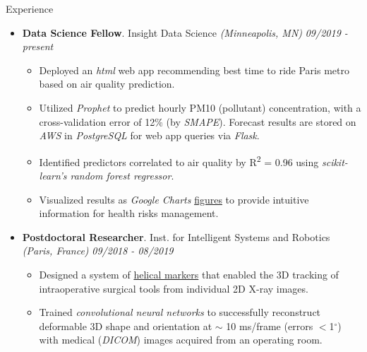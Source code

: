 \documentclass{resume} %
\begin{document}
	\begin{rSection}{Experience}
		
		\begin{itemize}[leftmargin=0em]
			\item {\bf Data Science Fellow}{. Insight Data Science \textit{(Minneapolis, MN)}} \hfill {\em 09/2019 - present}\\
			\vspace{-5mm}
			\begin{itemize}
				\setlength\itemsep{-1.75em}
				\item Deployed an \textit{html} web app recommending best time to ride Paris metro based on air quality prediction.\\
				\item Utilized \textit{Prophet} to predict hourly PM10 (pollutant) concentration, with a cross-validation error of 12\% (by \textit{SMAPE}). Forecast results are stored on \textit{AWS} in \textit{PostgreSQL} for web app queries via \textit{Flask}.\\
				\item Identified predictors correlated to air quality by R\textsuperscript{2} = 0.96 using \textit{scikit-learn's random forest regressor}.\\
				\item Visualized results as \textit{Google Charts} \href{https://tinyurl.com/yxptcaz7
				}{figures} to provide intuitive information for health risks management.
			\end{itemize}	
			
			\item {\bf Postdoctoral Researcher}{. Inst. for Intelligent Systems and Robotics \textit{(Paris, France)}} \hfill {\em 09/2018 - 08/2019}\\
			\vspace{-5mm}
			\begin{itemize}
				\setlength\itemsep{-1.75em}
				\item  Designed a system of \href{https://tinyurl.com/yxk4jou4}{helical markers} that enabled the 3D tracking of intraoperative surgical tools from individual 2D X-ray images.\\ 
				\item  Trained \textit{convolutional neural networks} to successfully reconstruct deformable 3D shape and orientation at $\sim$ 10 ms/frame (errors $<$1$^\circ$) with medical (\textit{DICOM}) images acquired from an operating room.
			\end{itemize}
			

\end{itemize}
\end{rSection}
\end{document}

